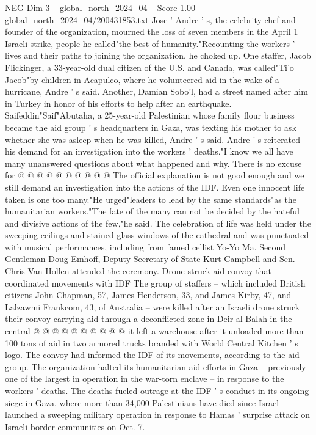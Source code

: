 \begin{textsample}{NEG Dim 3 – global\_north\_2024\_04 – Score 1.00 – global\_north\_2024\_04/200431853.txt}  \label{ex:f3_neg_404}
Jose ' Andre ' s, the celebrity chef and founder of the organization, mourned the loss of seven members in the April 1 Israeli strike, people he called"the best of humanity."Recounting the workers ' lives and their paths to joining the organization, he choked up.
One staffer, Jacob Flickinger, a 33-year-old dual citizen of the U.S. and Canada, was called"Ti'o Jacob"by children in Acapulco, where he volunteered aid in the wake of a hurricane, Andre ' s said.
Another, Damian Sobo'l, had a street named after him in Turkey in honor of his efforts to help after an earthquake.
Saifeddin"Saif"Abutaha, a 25-year-old Palestinian whose family flour business became the aid group ' s headquarters in Gaza, was texting his mother to ask whether she was asleep when he was killed, Andre ' s said.
Andre ' s reiterated his demand for an investigation into the workers ' deaths."I know we all have many unanswered questions about what happened and why.
There is no excuse for @ @ @ @ @ @ @ @ @ @ The official explanation is not good enough and we still demand an investigation into the actions of the IDF.
Even one innocent life taken is one too many."He urged"leaders to lead by the same standards"as the humanitarian workers."The fate of the many can not be decided by the hateful and divisive actions of the few,"he said.
The celebration of life was held under the sweeping ceilings and stained glass windows of the cathedral and was punctuated with musical performances, including from famed cellist Yo-Yo Ma.
Second Gentleman Doug Emhoff, Deputy Secretary of State Kurt Campbell and Sen.
Chris Van Hollen attended the ceremony.
Drone struck aid convoy that coordinated movements with IDF The group of staffers -- which included British citizens John Chapman, 57, James Henderson, 33, and James Kirby, 47, and Lalzawmi Frankcom, 43, of Australia -- were killed after an Israeli drone struck their convoy carrying aid through a deconflicted zone in Deir al-Balah in the central @ @ @ @ @ @ @ @ @ @ it left a warehouse after it unloaded more than 100 tons of aid in two armored trucks branded with World Central Kitchen ' s logo.
The convoy had informed the IDF of its movements, according to the aid group.
The organization halted its humanitarian aid efforts in Gaza -- previously one of the largest in operation in the war-torn enclave -- in response to the workers ' deaths.
The deaths fueled outrage at the IDF ' s conduct in its ongoing siege in Gaza, where more than 34,000 Palestinians have died since Israel launched a sweeping military operation in response to Hamas ' surprise attack on Israeli border communities on Oct. 7.

\end{textsample}

